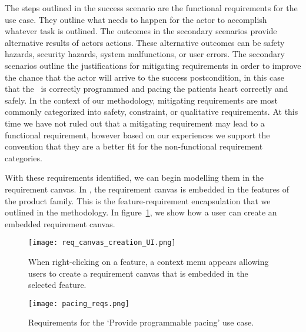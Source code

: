 The steps outlined in the success scenario are the functional requirements for the use case. They outline what needs to happen for the actor to accomplish whatever task is outlined. The outcomes in the secondary scenarios provide alternative results of actors actions. These alternative outcomes can be safety hazards, security hazards, system malfunctions, or user errors. The secondary scenarios outline the justifications for mitigating requirements in order to improve the chance that the actor will arrive to the success postcondition, in this case that the \pgd\ is correctly programmed and pacing the patients heart correctly and safely. In the context of our methodology, mitigating requirements are most commonly categorized into safety, constraint, or qualitative requirements. At this time we have not ruled out that a mitigating requirement may lead to a functional requirement, however based on our experiences we support the convention that they are a better fit for the non-functional requirement categories.

With these requirements identified, we can begin modelling them in the requirement canvas. In \tool, the requirement canvas is embedded in the features of the product family. This is the feature-requirement encapsulation that we outlined in the methodology. In figure~\ref{fig:req_canvas_creation_UI}, we show how a user can create an embedded requirement canvas.




\begin{figure}
	\centering
	\texttt{[image: req\_canvas\_creation\_UI.png]}
	\caption{When right-clicking on a feature, a context menu appears allowing users to create a requirement canvas that is embedded in the selected feature.}
	\label{fig:req_canvas_creation_UI}
\end{figure}

\begin{figure}
	\centering
	\texttt{[image: pacing\_reqs.png]}
	\caption{Requirements for the `Provide programmable pacing' use case.}
	\label{fig:pacing_reqs}
\end{figure}

